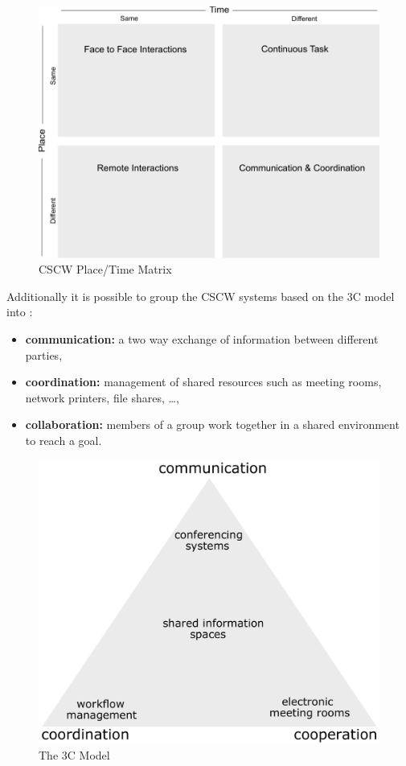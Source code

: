 \begin{figure}[H]
 \centering
 \includegraphics[width=0.8\columnwidth]{images/cscw_time_place_matrix.pdf}
 \caption[CSCW Place/Time Matrix]{\gls{CSCW} Place/Time Matrix \citep{xx}}
\label{fig:images_cscw_time_place_matrix}
\end{figure}

Additionally it is possible to group the CSCW systems based on the 3C model into \citep{Koch2008}:

\begin{itemize}
  \item \textbf{communication:} a two way exchange of information between different parties,
  \item \textbf{coordination:} management of shared resources such as meeting rooms, network printers, file shares, \ldots,
  \item \textbf{collaboration:} members of a group work together in a shared environment to reach a goal.
\end{itemize}

\begin{figure}[H]
 \centering
 \includegraphics[width=0.8\columnwidth]{images/3C-model.pdf}
 \caption[The 3C Model]{The 3C Model \citep{Koch2008}}
\label{fig:images_cscw_3C_model}
\end{figure}


